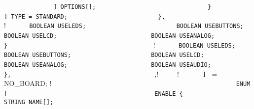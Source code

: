 {{{{{\lstinline!              ] OPTIONS[];                   ! \newline
\lstinline!            }                                ! \newline
\lstinline!          ] TYPE = STANDARD;                 ! \newline
\lstinline!        },                                   ! \newline
\lstinline!	   !\quad \quad{} {  ! \newline
\lstinline!	     BOOLEAN USELEDS;                   ! \newline
\lstinline!	     BOOLEAN USEBUTTONS;                ! \newline
\lstinline!	     BOOLEAN USELCD;                    ! \newline
\lstinline!	     BOOLEAN USEANALOG;                 ! \newline
\lstinline!	   }                                    ! \newline
\lstinline!	   !\quad \quad{} {  ! \newline
\lstinline!	     BOOLEAN USELEDS;                   ! \newline
\lstinline!	     BOOLEAN USEBUTTONS;                ! \newline
\lstinline!	     BOOLEAN USELCD;                    ! \newline
\lstinline!	     BOOLEAN USEANALOG;                 ! \newline
\lstinline!	     BOOLEAN USEAUDIO;                  ! \newline
\lstinline!	   },                                    ! \newline
\lstinline!	   !\quad \quad{},! \newline
\lstinline!	   !\quad \quad{}   ! \newline
\lstinline!      ] ! = NO_BOARD;  ! \newline
\lstinline!                                             ! \newline
\lstinline!      ENUM [                                 ! \newline
\lstinline!        ENABLE {                             ! \newline
\lstinline!          STRING NAME[];                     ! \newline
}}}}}}}
